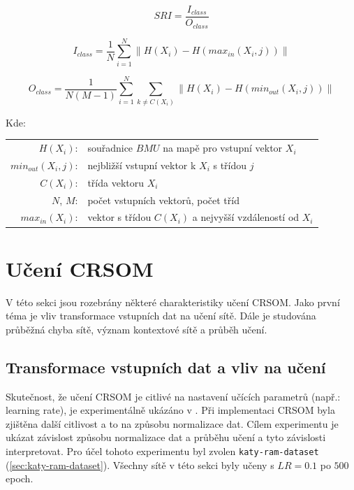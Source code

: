 \documentclass[thesis=M,czech]{FITthesis}[2012/06/26]
\begin{document}
\vspace{\baselineskip}
\noindent
\begin{minipage}[c]{\textwidth }

\begin{equation} \label{eq:sri}
    SRI=\frac{I_{class}}{O_{class}}
\end{equation}

\begin{equation} \label{eq:oclass}
	I_{class}  = \frac{1}{N}\sum_{i=1}^{N}  \| H(X_i) - H(max_{in}(X_i, j)) \|
\end{equation}


\begin{equation} \label{eq:iclass}
	O_{class}= \frac{1}{N(M-1)}\sum_{i=1}^{N}\sum_{k \neq C(X_i)} \| H(X_i) - H(min_{out}(X_i, j)) \|
\end{equation}



Kde:\\
\hspace*{3em}
\begin{tabular}{rl}
    $H(X_i)$:&  souřadnice $BMU$ na mapě pro vstupní vektor $X_i$  \\
    $min_{out}(X_i, j)$: & nejbližší vstupní vektor k $X_i$ s třídou $j$  \\
     $C(X_i)$:& třída vektoru  $X_i$\\
     $N$, $M$:& počet vstupních vektorů, počet tříd\\
     $max_{in}(X_i)$:& vektor s třídou $C(X_i)$ a nejvyšší vzdáleností od $X_i$ \\
\end{tabular}
\end{minipage} 
\vspace{\baselineskip}
\noindent


  
\section{Učení CRSOM}
V této sekci jsou rozebrány některé charakteristiky učení CRSOM. Jako první téma je vliv transformace vstupních dat na učení sítě. Dále je studována průběžná chyba sítě, význam kontextové sítě a průběh učení.


\subsection{Transformace vstupních dat a vliv na učení}

Skutečnost, že učení CRSOM je citlivé na nastavení učících parametrů (např.: learning rate), je experimentálně ukázáno v \cite{hartono14}. Při implementaci CRSOM byla zjištěna další citlivost a to na způsobu normalizace dat.
Cílem experimentu je ukázat závislost způsobu normalizace dat a průběhu učení a tyto závislosti interpretovat. 
Pro účel tohoto experimentu byl zvolen \texttt{katy-ram-dataset} (\ref{sec:katy-ram-dataset}). Všechny sítě v této sekci byly učeny s $LR=0.1$ po $500$ epoch.
\end{document}
